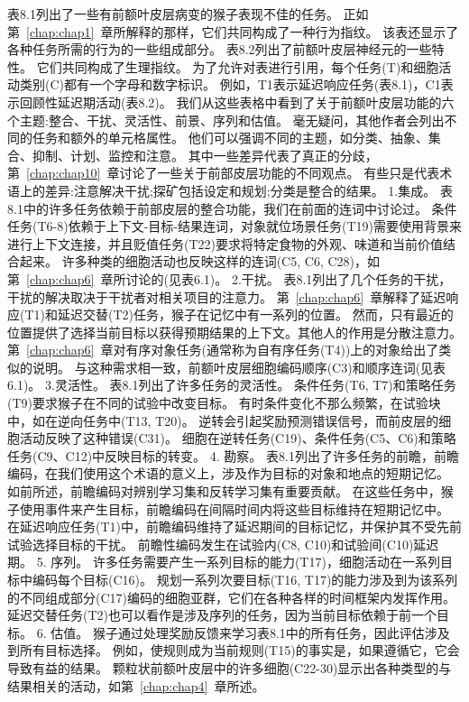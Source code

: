 表8.1列出了一些有前额叶皮层病变的猴子表现不佳的任务。
正如第~\ref{chap:chap1}~章所解释的那样，它们共同构成了一种行为指纹。
该表还显示了各种任务所需的行为的一些组成部分。
表8.2列出了前额叶皮层神经元的一些特性。
它们共同构成了生理指纹。
为了允许对表进行引用，每个任务(T)和细胞活动类别(C)都有一个字母和数字标识。
例如，T1表示延迟响应任务(表8.1)，C1表示回顾性延迟期活动(表8.2)。
我们从这些表格中看到了关于前额叶皮层功能的六个主题:整合、干扰、灵活性、前景、序列和估值。
毫无疑问，其他作者会列出不同的任务和额外的单元格属性。
他们可以强调不同的主题，如分类、抽象、集合、抑制、计划、监控和注意。
其中一些差异代表了真正的分歧，第~\ref{chap:chap10}~章讨论了一些关于前部皮层功能的不同观点。
有些只是代表术语上的差异:注意解决干扰;探矿包括设定和规划;分类是整合的结果。
1.集成。
表8.1中的许多任务依赖于前部皮层的整合功能，我们在前面的连词中讨论过。
条件任务(T6-8)依赖于上下文-目标-结果连词，对象就位场景任务(T19)需要使用背景来进行上下文连接，并且贬值任务(T22)要求将特定食物的外观、味道和当前价值结合起来。
许多种类的细胞活动也反映这样的连词(C5, C6, C28)，如第~\ref{chap:chap6}~章所讨论的(见表6.1)。
2.干扰。
表8.1列出了几个任务的干扰，干扰的解决取决于干扰者对相关项目的注意力。
第~\ref{chap:chap6}~章解释了延迟响应(T1)和延迟交替(T2)任务，猴子在记忆中有一系列的位置。
然而，只有最近的位置提供了选择当前目标以获得预期结果的上下文。其他人的作用是分散注意力。
第~\ref{chap:chap6}~章对有序对象任务(通常称为自有序任务(T4))上的对象给出了类似的说明。
与这种需求相一致，前额叶皮层细胞编码顺序(C3)和顺序连词(见表6.1)。
3.灵活性。
表8.1列出了许多任务的灵活性。
条件任务(T6, T7)和策略任务(T9)要求猴子在不同的试验中改变目标。
有时条件变化不那么频繁，在试验块中，如在逆向任务中(T13, T20)。
逆转会引起奖励预测错误信号，而前皮层的细胞活动反映了这种错误(C31)。
细胞在逆转任务(C19)、条件任务(C5、C6)和策略任务(C9、C12)中反映目标的转变。
4. 勘察。
表8.1列出了许多任务的前瞻，前瞻编码，在我们使用这个术语的意义上，涉及作为目标的对象和地点的短期记忆。
如前所述，前瞻编码对辨别学习集和反转学习集有重要贡献。
在这些任务中，猴子使用事件来产生目标，前瞻编码在间隔时间内将这些目标维持在短期记忆中。
在延迟响应任务(T1)中，前瞻编码维持了延迟期间的目标记忆，并保护其不受先前试验选择目标的干扰。
前瞻性编码发生在试验内(C8, C10)和试验间(C10)延迟期。
5. 序列。
许多任务需要产生一系列目标的能力(T17)，细胞活动在一系列目标中编码每个目标(C16)。
规划一系列次要目标(T16, T17)的能力涉及到为该系列的不同组成部分(C17)编码的细胞亚群，它们在各种各样的时间框架内发挥作用。
延迟交替任务(T2)也可以看作是涉及序列的任务，因为当前目标依赖于前一个目标。
6. 估值。
猴子通过处理奖励反馈来学习表8.1中的所有任务，因此评估涉及到所有目标选择。
例如，使规则成为当前规则(T15)的事实是，如果遵循它，它会导致有益的结果。
颗粒状前额叶皮层中的许多细胞(C22-30)显示出各种类型的与结果相关的活动，如第~\ref{chap:chap4}~章所述。



